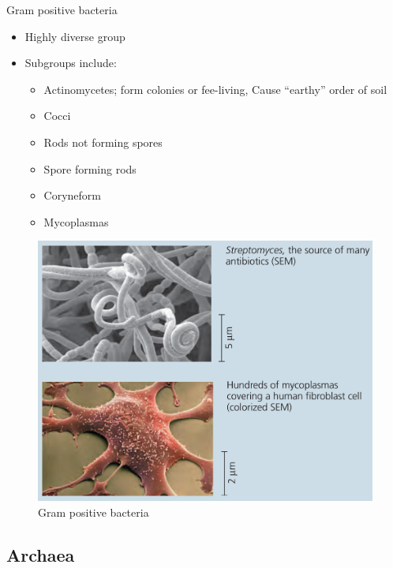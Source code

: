\documentclass[ignorenonframetext,aspectratio=169]{beamer}
\providecommand{\tightlist}{%
  \setlength{\itemsep}{0pt}\setlength{\parskip}{0pt}}
\begin{document}
\begin{frame}{Gram positive bacteria}
\protect\hypertarget{gram-positive-bacteria}{}

\begin{itemize}
\tightlist
\item
  Highly diverse group
\item
  Subgroups include:

  \begin{itemize}
  \tightlist
  \item
    Actinomycetes; form colonies or fee-living, Cause ``earthy'' order
    of soil
  \item
    Cocci
  \item
    Rods not forming spores
  \item
    Spore forming rods
  \item
    Coryneform
  \item
    Mycoplasmas
  \end{itemize}
\end{itemize}

\end{frame}

\begin{frame}{}
\protect\hypertarget{section-9}{}

\begin{figure}
\includegraphics[width=0.55\linewidth]{./../images/gram_positive_str_myc} \caption{Gram positive bacteria}\label{fig:gram-positive}
\end{figure}

\end{frame}

\hypertarget{archaea}{%
\subsection{Archaea}\label{archaea}}
\end{document}
